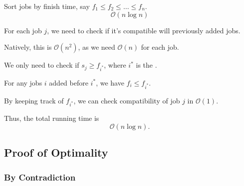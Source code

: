 \begin{listu}
    \item Sort jobs by finish time, say $f_1 \le f_2 \le \dots \le f_n$. \[
        \mathcal{O}(n \log n)
    \]

    \item For each job $j$, we need to check if it's compatible will  previously added jobs. 
    
    \begin{listu}
        \item Natively, this is $\mathcal{O}(n^2)$, as we need $\mathcal{O}(n)$ for each job.
        \item We only need to check if $s_j \ge f_{i^*}$, where $i^*$ is the .
        \begin{listu}
            \item For any jobs $i$ added before $i^*$, we have $f_i \le f_{i^*}$.
            \item By keeping track of $f_{i^*}$, we can check compatibility of job $j$ in $\mathcal{O}(1)$.
        \end{listu}
    \end{listu}

    \item Thus, the total running time is \[ 
        \mathcal{O}(n \log n).
    \]
\end{listu}

\subsection{Proof of Optimality}

\subsubsection{By Contradiction}

